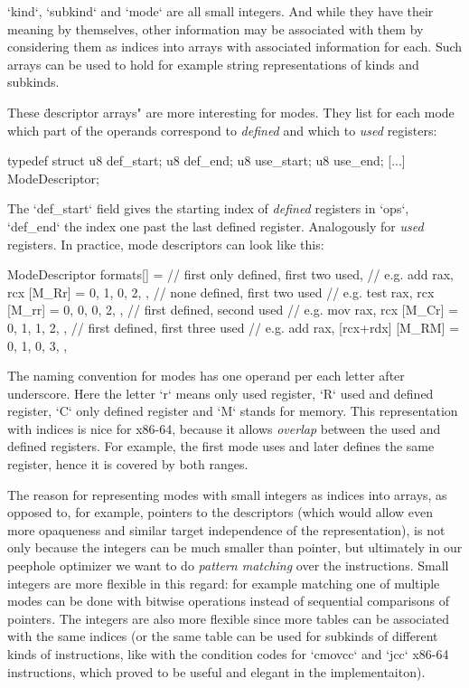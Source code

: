 `kind`, `subkind` and `mode` are all small integers. And while
they have their meaning by themselves, other information may be associated with
them by considering them as indices into arrays with associated information for
each. Such arrays can be used to hold for example string representations of
kinds and subkinds.

These \"descriptor arrays" are more interesting for modes. They list for each
mode which part of the operands correspond to {\em defined} and which to {\em
used} registers:

\begtt
typedef struct {
	u8 def_start;
	u8 def_end;
	u8 use_start;
	u8 use_end;
	[...]
} ModeDescriptor;
\endtt

The `def_start` field gives the starting index of {\em defined} registers in `ops`,
`def_end` the index one past the last defined register. Analogously for {\em
used} registers. In practice, mode descriptors can look like this:

\begtt
ModeDescriptor formats[] = {
	// first only defined, first two used,
	// e.g. add rax, rcx
	[M_Rr] = { 0, 1, 0, 2, },
	// none defined, first two used
	// e.g. test rax, rcx
	[M_rr] = { 0, 0, 0, 2, },
	// first defined, second used
	// e.g. mov rax, rcx
	[M_Cr] = { 0, 1, 1, 2, },
	// first defined, first three used
	// e.g. add rax, [rcx+rdx]
	[M_RM] = { 0, 1, 0, 3, },
}
\endtt

The naming convention for modes has one operand per each letter after
underscore. Here the letter `r` means only used register, `R` used and defined register,
`C` only defined register and `M` stands for memory. This representation with
indices is nice for x86-64, because it allows {\em overlap} between the used and
defined registers. For example, the first mode uses and later defines the same
register, hence it is covered by both ranges.

The reason for representing modes with small integers as indices into arrays, as
opposed to, for example, pointers to the descriptors (which would allow even
more opaqueness and similar target independence of the representation), is
not only because the integers can be much smaller than pointer, but ultimately
in our peephole optimizer we want to do {\em pattern matching} over the
instructions. Small integers are more flexible in this regard: for
example matching one of multiple modes can be done with bitwise operations
instead of sequential comparisons of pointers. The integers are also more
flexible since more tables can be associated with the same indices (or the same
table can be used for subkinds of different kinds of instructions, like with the
condition codes for `cmovcc` and `jcc` x86-64 instructions, which proved to be
useful and elegant in the implementaiton).

